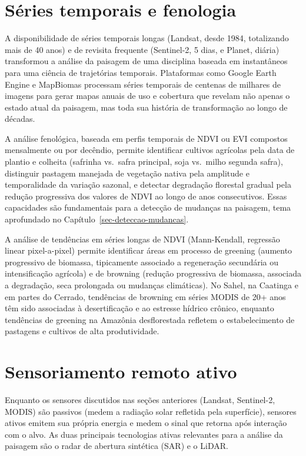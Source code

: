 \documentclass[
  portuguese,
  11pt,
  a4paper,
  open=any]{scrbook}
\begin{document}
\section{Séries temporais e
fenologia}\label{suxe9ries-temporais-e-fenologia}

A disponibilidade de séries temporais longas (Landsat, desde 1984,
totalizando mais de 40 anos) e de revisita frequente (Sentinel-2, 5
dias, e Planet, diária) transformou a análise da paisagem de uma
disciplina baseada em instantâneos para uma ciência de trajetórias
temporais. Plataformas como Google Earth Engine e MapBiomas processam
séries temporais de centenas de milhares de imagens para gerar mapas
anuais de uso e cobertura que revelam não apenas o estado atual da
paisagem, mas toda sua história de transformação ao longo de décadas.

A análise fenológica, baseada em perfis temporais de NDVI ou EVI
compostos mensalmente ou por decêndio, permite identificar cultivos
agrícolas pela data de plantio e colheita (safrinha vs.~safra principal,
soja vs.~milho segunda safra), distinguir pastagem manejada de vegetação
nativa pela amplitude e temporalidade da variação sazonal, e detectar
degradação florestal gradual pela redução progressiva dos valores de
NDVI ao longo de anos consecutivos. Essas capacidades são fundamentais
para a detecção de mudanças na paisagem, tema aprofundado no
Capítulo~\ref{sec-deteccao-mudancas}.

A análise de tendências em séries longas de NDVI (Mann-Kendall,
regressão linear pixel-a-pixel) permite identificar áreas em processo de
greening (aumento progressivo de biomassa, tipicamente associado a
regeneração secundária ou intensificação agrícola) e de browning
(redução progressiva de biomassa, associada a degradação, seca
prolongada ou mudanças climáticas). No Sahel, na Caatinga e em partes do
Cerrado, tendências de browning em séries MODIS de 20+ anos têm sido
associadas à desertificação e ao estresse hídrico crônico, enquanto
tendências de greening na Amazônia desflorestada refletem o
estabelecimento de pastagens e cultivos de alta produtividade.

\section{Sensoriamento remoto ativo}\label{sensoriamento-remoto-ativo}

Enquanto os sensores discutidos nas seções anteriores (Landsat,
Sentinel-2, MODIS) são passivos (medem a radiação solar refletida pela
superfície), sensores ativos emitem sua própria energia e medem o sinal
que retorna após interação com o alvo. As duas principais tecnologias
ativas relevantes para a análise da paisagem são o radar de abertura
sintética (SAR) e o LiDAR.
\end{document}
